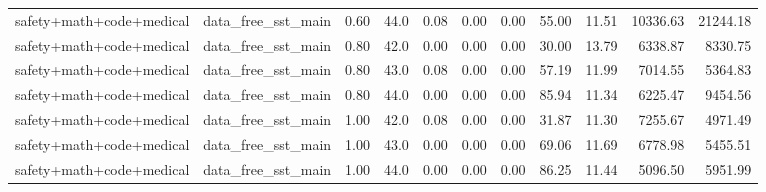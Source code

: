 \documentclass{article}
\begin{document}
\begin{table}[H]
{\begin{tabular}{llllrrrrrrr}
safety+math+code+medical & data\_free\_sst\_main & 0.60 & 44.0 & 0.08 & 0.00 & 0.00 & 55.00 & 11.51 & 10336.63 & 21244.18 \\
safety+math+code+medical & data\_free\_sst\_main & 0.80 & 42.0 & 0.00 & 0.00 & 0.00 & 30.00 & 13.79 & 6338.87 & 8330.75 \\
safety+math+code+medical & data\_free\_sst\_main & 0.80 & 43.0 & 0.08 & 0.00 & 0.00 & 57.19 & 11.99 & 7014.55 & 5364.83 \\
safety+math+code+medical & data\_free\_sst\_main & 0.80 & 44.0 & 0.00 & 0.00 & 0.00 & 85.94 & 11.34 & 6225.47 & 9454.56 \\
safety+math+code+medical & data\_free\_sst\_main & 1.00 & 42.0 & 0.08 & 0.00 & 0.00 & 31.87 & 11.30 & 7255.67 & 4971.49 \\
safety+math+code+medical & data\_free\_sst\_main & 1.00 & 43.0 & 0.00 & 0.00 & 0.00 & 69.06 & 11.69 & 6778.98 & 5455.51 \\
safety+math+code+medical & data\_free\_sst\_main & 1.00 & 44.0 & 0.00 & 0.00 & 0.00 & 86.25 & 11.44 & 5096.50 & 5951.99 \\
\bottomrule
\end{tabular}
}
\end{table}
\end{document}
